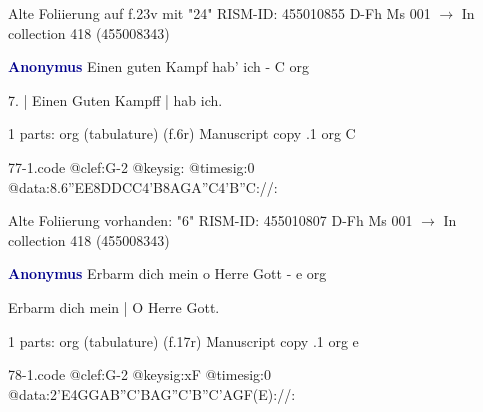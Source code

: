 \documentclass[twocolumn]{book}
\begin{document}
\newline Alte Foliierung auf f.23v mit "24"
\newline RISM-ID: 455010855
\newline D-Fh  Ms 001
\newline $\rightarrow$ In collection 418 (455008343)
      
\newline \par \vspace{7pt} \textcolor{darkblue}{\textbf{Anonymus  }}
\newline Einen guten Kampf hab' ich - C
\newline org
\newline \begin{itshape}[f.6r, at left:] 7. | Einen Guten Kampff | hab ich.\end{itshape} 
\newline \textcolor{darkblue}{}  1 parts: org (tabulature)  (f.6r)
\newline Manuscript copy
.1  org  C  
\begin{filecontents*}{77-1.code}
@clef:G-2
@keysig:
@timesig:0
@data:8.6''EE{8DD}{CC}4'B{8AGA''C}4'B''C://:
\end{filecontents*}
\newline
%

\newline Alte Foliierung vorhanden: "6"
\newline RISM-ID: 455010807
\newline D-Fh  Ms 001
\newline $\rightarrow$ In collection 418 (455008343)
      
\newline \par \vspace{7pt} \textcolor{darkblue}{\textbf{Anonymus  }}
\newline Erbarm dich mein o Herre Gott - e
\newline org
\newline \begin{itshape}[f.17r, at left:] Erbarm dich mein | O Herre Gott.\end{itshape} 
\newline \textcolor{darkblue}{}  1 parts: org (tabulature)  (f.17r)
\newline Manuscript copy
.1  org  e  
\begin{filecontents*}{78-1.code}
@clef:G-2
@keysig:xF
@timesig:0
@data:2'E4GGAB''C'BAG''C'B''C'AGF(E)://:
\end{filecontents*}
\newline
%
\end{document}
